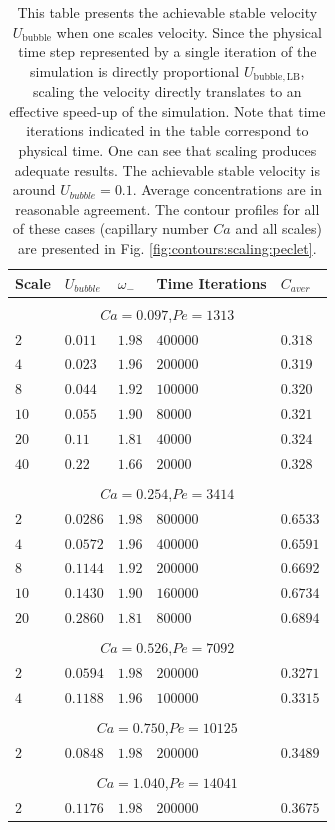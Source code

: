 \documentclass{article}
\newcommand{\ububble}{U_{\mathrm{bubble}}}
\newcommand{\omegaminus}{\omega_{-}}
\begin{document}
\begin{table}[htb!]
\begin{tabularx}{\textwidth}{|X|X|X|X|X|}
\hline
Scale&$U_{bubble}$&$\omegaminus$&Time Iterations&$C_{aver}$\\
\hline
\multicolumn{5}{c}{}\\
\multicolumn{5}{c}{$Ca=0.097$,$Pe=1313$}\\
\hline
$2$ &$0.011$&$1.98$&$400000$&$0.318$\\
$4$ &$0.023$&$1.96$&$200000$&$0.319$\\
$8$ &$0.044$&$1.92$&$100000$&$0.320$\\
$10$&$0.055$&$1.90$&$80000$ &$0.321$\\
$20$&$0.11 $&$1.81$&$40000$ &$0.324$\\
$40$&$0.22 $&$1.66$&$20000$ &$0.328$\\
\hline
\multicolumn{5}{c}{}\\
\multicolumn{5}{c}{$Ca=0.254$,$Pe=3414$}\\
\hline
$2$& $0.0286$&$1.98$&$800000$&$0.6533$\\
$4$& $0.0572$&$1.96$&$400000$&$0.6591$\\
$8$& $0.1144$&$1.92$&$200000$&$0.6692$\\
$10$&$0.1430$&$1.90$&$160000$&$0.6734$\\
$20$&$0.2860$&$1.81$&$80000$ &$0.6894$\\
\hline
\multicolumn{5}{c}{}\\
\multicolumn{5}{c}{$Ca=0.526$,$Pe=7092$}\\
\hline
$2$&$0.0594$&$1.98$&$200000$&$0.3271$\\
$4$&$0.1188$&$1.96$&$100000$&$0.3315$\\
\hline
\multicolumn{5}{c}{}\\
\multicolumn{5}{c}{$Ca=0.750$,$Pe=10125$}\\
\hline
$2$&$0.0848$&$1.98$&$200000$&$0.3489$\\
\hline
\multicolumn{5}{c}{}\\
\multicolumn{5}{c}{$Ca=1.040$,$Pe=14041$}\\
\hline
$2$&$0.1176$&$1.98$&$200000$&$0.3675$\\
\hline
\end{tabularx}
\caption{This table presents the achievable stable velocity $\ububble$ when one scales velocity. Since
the physical time step represented by a single iteration of the simulation is directly proportional
$U_{\mathrm{bubble,LB}}$, scaling the velocity directly translates to an effective speed-up of the simulation.
Note that time iterations
indicated in the table correspond to physical time. One can see that
scaling produces adequate results.  The achievable stable velocity is around $U_{bubble}=0.1$. Average concentrations are in reasonable agreement. The contour
profiles for all of these cases (capillary number $Ca$ and all scales) are presented in Fig.
\ref{fig:contours:scaling:peclet}.
\label{table:scaling:peclet}}
\end{table}
\end{document}
